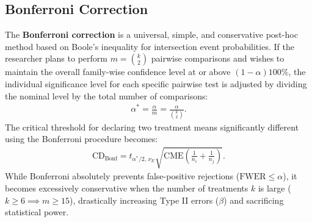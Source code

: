 \subsection*{Bonferroni Correction}
The \textbf{Bonferroni correction} is a universal, simple, and conservative post-hoc method based on Boole's inequality for intersection event probabilities. If the researcher plans to perform $m = \binom{k}{2}$ pairwise comparisons and wishes to maintain the overall family-wise confidence level at or above $(1-\alpha)100\%$, the individual significance level for each specific pairwise test is adjusted by dividing the nominal level by the total number of comparisons:
\begin{align}
	\alpha^* = \frac{\alpha}{m} = \frac{\alpha}{\binom{k}{2}}.
\end{align}
The critical threshold for declaring two treatment means significantly different using the Bonferroni procedure becomes:
\begin{align}
	\text{CD}_{\text{Bonf}} = t_{\alpha^*/2, \, \nu_E} \sqrt{\text{CME} \left( \frac{1}{n_i} + \frac{1}{n_j} \right)}.
\end{align}
While Bonferroni absolutely prevents false-positive rejections ($\text{FWER} \leq \alpha$), it becomes excessively conservative when the number of treatments $k$ is large ($k \geq 6 \implies m \geq 15$), drastically increasing Type II errors ($\beta$) and sacrificing statistical power.
